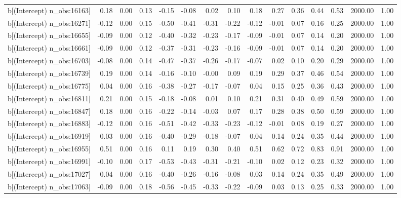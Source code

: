 \begin{table}[ht]
\begin{tabular}{rrrrrrrrrrrrrrr}
  b[(Intercept) n\_obs:16163] & 0.18 & 0.00 & 0.13 & -0.15 & -0.08 & 0.02 & 0.10 & 0.18 & 0.27 & 0.36 & 0.44 & 0.53 & 2000.00 & 1.00 \\ 
  b[(Intercept) n\_obs:16271] & -0.12 & 0.00 & 0.15 & -0.50 & -0.41 & -0.31 & -0.22 & -0.12 & -0.01 & 0.07 & 0.16 & 0.25 & 2000.00 & 1.00 \\ 
  b[(Intercept) n\_obs:16655] & -0.09 & 0.00 & 0.12 & -0.40 & -0.32 & -0.23 & -0.17 & -0.09 & -0.01 & 0.07 & 0.14 & 0.20 & 2000.00 & 1.00 \\ 
  b[(Intercept) n\_obs:16661] & -0.09 & 0.00 & 0.12 & -0.37 & -0.31 & -0.23 & -0.16 & -0.09 & -0.01 & 0.07 & 0.14 & 0.20 & 2000.00 & 1.00 \\ 
  b[(Intercept) n\_obs:16703] & -0.08 & 0.00 & 0.14 & -0.47 & -0.37 & -0.26 & -0.17 & -0.07 & 0.02 & 0.10 & 0.20 & 0.29 & 2000.00 & 1.00 \\ 
  b[(Intercept) n\_obs:16739] & 0.19 & 0.00 & 0.14 & -0.16 & -0.10 & -0.00 & 0.09 & 0.19 & 0.29 & 0.37 & 0.46 & 0.54 & 2000.00 & 1.00 \\ 
  b[(Intercept) n\_obs:16775] & 0.04 & 0.00 & 0.16 & -0.38 & -0.27 & -0.17 & -0.07 & 0.04 & 0.15 & 0.25 & 0.36 & 0.43 & 2000.00 & 1.00 \\ 
  b[(Intercept) n\_obs:16811] & 0.21 & 0.00 & 0.15 & -0.18 & -0.08 & 0.01 & 0.10 & 0.21 & 0.31 & 0.40 & 0.49 & 0.59 & 2000.00 & 1.00 \\ 
  b[(Intercept) n\_obs:16847] & 0.18 & 0.00 & 0.16 & -0.22 & -0.14 & -0.03 & 0.07 & 0.17 & 0.28 & 0.38 & 0.50 & 0.59 & 2000.00 & 1.00 \\ 
  b[(Intercept) n\_obs:16883] & -0.12 & 0.00 & 0.16 & -0.51 & -0.42 & -0.33 & -0.23 & -0.12 & -0.01 & 0.08 & 0.19 & 0.27 & 2000.00 & 1.00 \\ 
  b[(Intercept) n\_obs:16919] & 0.03 & 0.00 & 0.16 & -0.40 & -0.29 & -0.18 & -0.07 & 0.04 & 0.14 & 0.24 & 0.35 & 0.44 & 2000.00 & 1.00 \\ 
  b[(Intercept) n\_obs:16955] & 0.51 & 0.00 & 0.16 & 0.11 & 0.19 & 0.30 & 0.40 & 0.51 & 0.62 & 0.72 & 0.83 & 0.91 & 2000.00 & 1.00 \\ 
  b[(Intercept) n\_obs:16991] & -0.10 & 0.00 & 0.17 & -0.53 & -0.43 & -0.31 & -0.21 & -0.10 & 0.02 & 0.12 & 0.23 & 0.32 & 2000.00 & 1.00 \\ 
  b[(Intercept) n\_obs:17027] & 0.04 & 0.00 & 0.16 & -0.40 & -0.26 & -0.16 & -0.08 & 0.03 & 0.14 & 0.24 & 0.35 & 0.49 & 2000.00 & 1.00 \\ 
  b[(Intercept) n\_obs:17063] & -0.09 & 0.00 & 0.18 & -0.56 & -0.45 & -0.33 & -0.22 & -0.09 & 0.03 & 0.13 & 0.25 & 0.33 & 2000.00 & 1.00 \\ 

\end{tabular}
\end{table}
